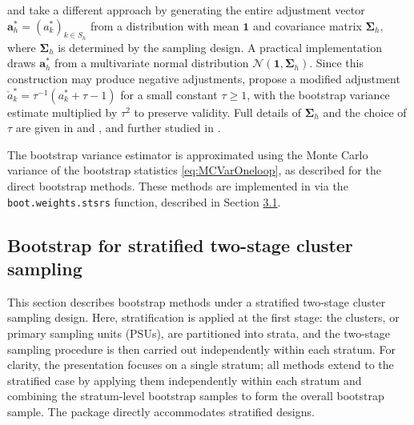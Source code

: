 \citet{Bertail:Combris:1997} and \citet{Beaumont:Patak:2012} take a different approach by generating the entire adjustment vector \(\boldsymbol{a}_h^* = (a_k^*)_{k \in \textrm{$S$}_h}\) from a distribution with mean \(\boldsymbol{1}\) and covariance matrix \(\boldsymbol{\Sigma}_h\), where \(\boldsymbol{\Sigma}_h\) is determined by the sampling design. A practical implementation draws \(\boldsymbol{a}_h^*\) from a multivariate normal distribution \(\mathcal{N}(\boldsymbol{1}, \boldsymbol{\Sigma}_h)\). Since this construction may produce negative adjustments, \citet{Beaumont:Patak:2012} propose a modified adjustment \(\check{a}_k^* = \tau^{-1}(a_k^* + \tau - 1)\) for a small constant \(\tau \geq 1\), with the bootstrap variance estimate multiplied by \(\tau^2\) to preserve validity. Full details of \(\boldsymbol{\Sigma}_h\) and the choice of \(\tau\) are given in \citet{Bertail:Combris:1997} and \citet{Beaumont:Patak:2012}, and further studied in \citet{Mashreghi:Haziza:Leger:2016}.

The bootstrap variance estimator is approximated using the Monte Carlo variance of the bootstrap statistics \eqref{eq:MCVarOneloop}, as described for the direct bootstrap methods.
These methods are implemented in  via the \texttt{boot.weights.stsrs} function, described in Section \hyperref[sec:pkgbootsurvsrs]{3.1}.

\subsection{Bootstrap for stratified two-stage cluster sampling}\label{Boot_TwoStage}

This section describes bootstrap methods under a stratified two-stage cluster sampling design. Here, stratification is applied at the first stage: the clusters, or primary sampling units (PSUs), are partitioned into strata, and the two-stage sampling procedure is then carried out independently within each stratum. For clarity, the presentation focuses on a single stratum; all methods extend to the stratified case by applying them independently within each stratum and combining the stratum-level bootstrap samples to form the overall bootstrap sample. The  package directly accommodates stratified designs.

